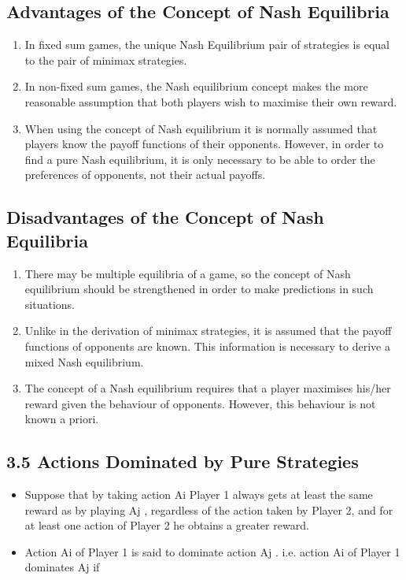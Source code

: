 \documentclass[]{report}
\begin{document}
	\subsection{Advantages of the Concept of Nash Equilibria}
	\begin{enumerate}
		\item  In fixed sum games, the unique Nash Equilibrium pair
		of strategies is equal to the pair of minimax
		strategies.
		\item  In non-fixed sum games, the Nash equilibrium
		concept makes the more reasonable assumption that
		both players wish to maximise their own reward.
		\item  When using the concept of Nash equilibrium it is
		normally assumed that players know the payoff
		functions of their opponents. However, in order to
		find a pure Nash equilibrium, it is only necessary to
		be able to order the preferences of opponents, not
		their actual payoffs.
	\end{enumerate}
	
	\subsection{Disadvantages of the Concept of Nash Equilibria}
	\begin{enumerate}
		\item There may be multiple equilibria of a game, so the
		concept of Nash equilibrium should be strengthened
		in order to make predictions in such situations.
		\item Unlike in the derivation of minimax strategies, it is
		assumed that the payoff functions of opponents are
		known. This information is necessary to derive a
		mixed Nash equilibrium.
		\item  The concept of a Nash equilibrium requires that a
		player maximises his/her reward given the behaviour
		of opponents. However, this behaviour is not known
		a priori.
	\end{enumerate}
	
	\subsection{3.5 Actions Dominated by Pure Strategies}
\begin{itemize}
	\item 	Suppose that by taking action Ai Player 1 always gets at least the
	same reward as by playing Aj , regardless of the action taken by
	Player 2, and for at least one action of Player 2 he obtains a
	greater reward. 
	\item Action Ai of Player 1 is said to dominate action Aj	.
	i.e. action Ai of Player 1 dominates Aj
	if
\end{itemize}
\end{document}
